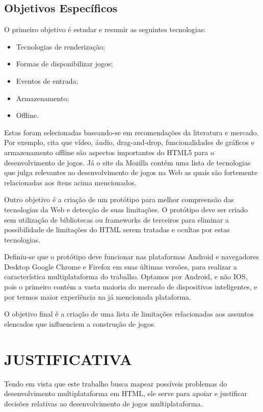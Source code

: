 \subsection{Objetivos Específicos}

O primeiro objetivo é estudar e resumir as seguintes tecnologias:
\begin{itemize}
\item Tecnologias de renderização;
\item Formas de disponibilizar jogos;
\item Eventos de entrada;
\item Armazenamento;
\item Offline.
\end{itemize}

Estas foram selecionadas baseando-se em recomendações da literatura
e mercado. Por exemplo, \citet{browserGamesTechnologyAndFuture} cita
que vídeo, áudio, drag-and-drop, funcionalidades de gráficos e
armazenamento offline são aspectos importantes do HTML5 para o
desenvolvimento de jogos. Já o site da Mozilla \citet{gamesIntroduction}
contém uma lista de tecnologias que julga relevantes ao desenvolvimento
de jogos na Web as quais são fortemente relacionadas aos itens acima
mencionados.

Outro objetivo é a criação de um protótipo para melhor compreensão
das tecnologias da Web e detecção de suas limitações. O protótipo
deve ser criado sem utilização de bibliotecas ou frameworks de
terceiros para eliminar a possibilidade de limitações  do HTML serem tratadas
e ocultas por estas tecnologias. 

Definiu-se que o protótipo deve funcionar nas plataformas Android e
navegadores Desktop Google Chrome e Firefox em suas últimas versões,
para realizar a característica multiplataforma do trabalho.  Optamos por
Android, e não IOS, pois o primeiro contém a vasta maioria do mercado
de dispositivos inteligentes, e por termos maior experiência na já
mencionada plataforma.

O objetivo final é a criação de uma lista de limitações relacionadas
aos assuntos elencados que influenciem a construção de jogos.

\section{JUSTIFICATIVA}

Tendo em vista que este trabalho busca mapear possíveis problemas
do desenvolvimento multiplataforma em HTML, ele serve para apoiar
e justificar decisões relativas ao desenvolvimento de jogos
multiplataforma.

